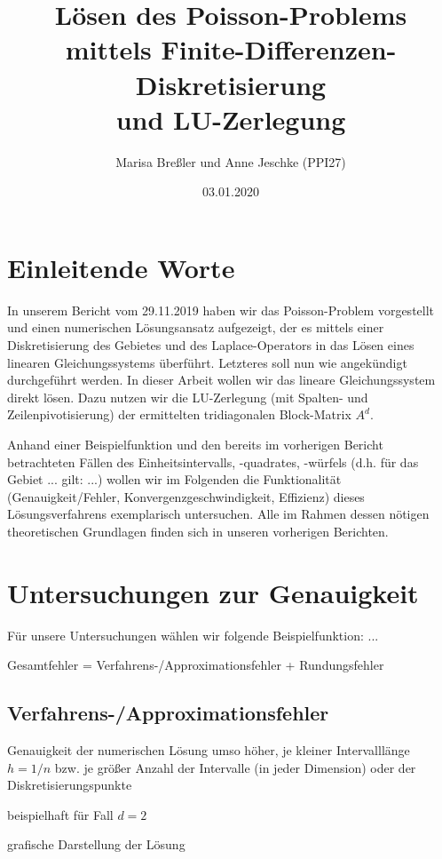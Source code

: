 \documentclass{scrartcl}
\begin{document}
\title{Lösen des Poisson-Problems mittels Finite-Differenzen-Diskretisierung\\
und LU-Zerlegung}
\author{Marisa Breßler und Anne Jeschke (PPI27)}
\date{03.01.2020}
\maketitle

\tableofcontents

\pagebreak
\section{Einleitende Worte}
In unserem Bericht  vom 29.11.2019 haben wir das Poisson-Problem vorgestellt und einen numerischen Lösungsansatz aufgezeigt, der es mittels einer Diskretisierung des Gebietes und des Laplace-Operators in das Lösen eines linearen Gleichungssystems überführt.
Letzteres soll nun wie angekündigt durchgeführt werden.
In dieser Arbeit wollen wir das lineare Gleichungssystem direkt lösen.
Dazu nutzen wir die LU-Zerlegung (mit Spalten- und Zeilenpivotisierung) der ermittelten tridiagonalen Block-Matrix $A^d$.

Anhand einer Beispielfunktion und den bereits im vorherigen Bericht betrachteten Fällen des Einheitsintervalls, -quadrates, -würfels (d.h. für das Gebiet ... gilt:
...)
wollen wir im Folgenden die Funktionalität (Genauigkeit/Fehler, Konvergenzgeschwindigkeit, Effizienz) dieses Lösungsverfahrens exemplarisch untersuchen.
Alle im Rahmen dessen nötigen theoretischen Grundlagen finden sich in unseren vorherigen Berichten.

\pagebreak
\section{Untersuchungen zur Genauigkeit}
Für unsere Untersuchungen wählen wir folgende Beispielfunktion:
...

Gesamtfehler = Verfahrens-/Approximationsfehler + Rundungsfehler

\subsection{Verfahrens-/Approximationsfehler}
Genauigkeit der numerischen Lösung umso höher, je kleiner Intervalllänge $h=1/n$ bzw. je größer Anzahl der Intervalle (in jeder Dimension) oder der Diskretisierungspunkte

beispielhaft für Fall $d=2$

grafische Darstellung der Lösung
\end{document}
